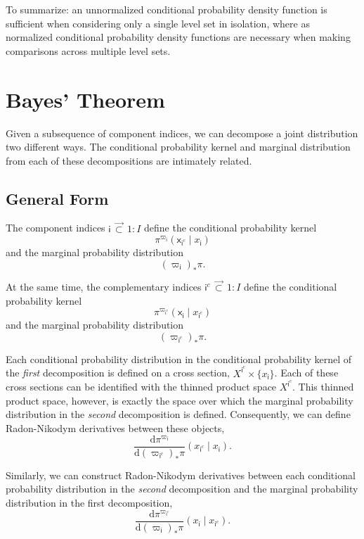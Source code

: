 \documentclass[
  letterpaper,
  DIV=11,
  numbers=noendperiod]{scrartcl}
\begin{document}
To summarize: an unnormalized conditional probability density function
is sufficient when considering only a single level set in isolation,
where as normalized conditional probability density functions are
necessary when making comparisons across multiple level sets.

\section{Bayes' Theorem}\label{bayes-theorem}

Given a subsequence of component indices, we can decompose a joint
distribution two different ways. The conditional probability kernel and
marginal distribution from each of these decompositions are intimately
related.

\subsection{General Form}\label{general-form}

The component indices \(\mathsf{i} \, \vec{\subset} \, 1:I\) define the
conditional probability kernel \[
\pi^{\varpi_{\mathsf{i}}}(
  \mathsf{x}_{\mathsf{i}^{c}} \mid
  x_{ \mathsf{i} }
)
\] and the marginal probability distribution \[
( \varpi_{\mathsf{i}} )_{*} \pi.
\]

At the same time, the complementary indices
\(\mathsf{i}^{c} \, \vec{\subset} \, 1:I\) define the conditional
probability kernel \[
\pi^{\varpi_{ \mathsf{i}^{c} }}(
  \mathsf{x}_{\mathsf{i}} \mid
  x_{ \mathsf{i}^{c} }
)
\] and the marginal probability distribution \[
( \varpi_{ \mathsf{i}^{c} } )_{*} \pi.
\]

Each conditional probability distribution in the conditional probability
kernel of the \emph{first} decomposition is defined on a cross section,
\(X^{\mathsf{i}^{c}} \times \{ x_{\mathsf{i}} \}\). Each of these cross
sections can be identified with the thinned product space
\(X^{\mathsf{i}^{c}}\). This thinned product space, however, is exactly
the space over which the marginal probability distribution in the
\emph{second} decomposition is defined. Consequently, we can define
Radon-Nikodym derivatives between these objects, \[
\frac{
  \mathrm{d} \pi^{ \varpi_{\mathsf{i}} }
}{
  \mathrm{d} ( \varpi_{ \mathsf{i}^{c} } )_{*} \pi
}
( x_{ \mathsf{i}^{c} } \mid
  x_{ \mathsf{i} } ).
\]

Similarly, we can construct Radon-Nikodym derivatives between each
conditional probability distribution in the \emph{second} decomposition
and the marginal probability distribution in the first decomposition, \[
\frac{
  \mathrm{d} \pi^{ \varpi_{ \mathsf{i}^{c} } }
}{
  \mathrm{d} ( \varpi_{ \mathsf{i} } )_{*} \pi
}
( x_{ \mathsf{i} } \mid
  x_{ \mathsf{i}^{c} } ).
\]
\end{document}
